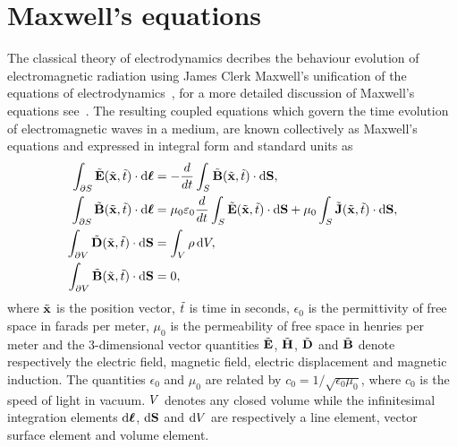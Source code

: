 \section{Maxwell's equations}
The classical theory of electrodynamics decribes the behaviour evolution of electromagnetic radiation using James Clerk Maxwell's unification of the equations of electrodynamics~\cite{Maxwell:1863ur}, for a more detailed discussion of Maxwell's equations see~\cite{Balanis:ui,Jackson:490457}. The resulting coupled equations which govern the time evolution of electromagnetic waves in a medium, are known collectively as Maxwell's equations and expressed in integral form and standard units as
\begin{subequations}
\begin{align}
    \int_{\partial S} \tilde{\mathbf{E}}(\tilde{\mathbf{x}},\tilde{t}) \cdot \mathrm{d}\boldsymbol{\ell}  &= - \frac{d}{dt} \int_{S} \tilde{\mathbf{B}}(\tilde{\mathbf{x}},\tilde{t}) \cdot \mathrm{d}\mathbf{S}, \label{eq:maxwell-faraday-integral} \\
    \int_{\partial S} \tilde{\mathbf{B}}(\tilde{\mathbf{x}},\tilde{t}) \cdot \mathrm{d}\boldsymbol{\ell} &= \mu_0 \varepsilon_0 \frac{d}{dt} \int_{S} \tilde{\mathbf{E}}(\tilde{\mathbf{x}},\tilde{t}) \cdot \mathrm{d}\mathbf{S} +  \mu_0 \int_{S} \tilde{\mathbf{J}}(\tilde{\mathbf{x}},\tilde{t}) \cdot \mathrm{d}\mathbf{S}, \label{eq:maxwell-ampere-integral} \\
    \int_{\partial V} \tilde{\mathbf{D}}(\tilde{\mathbf{x}},\tilde{t})\cdot\mathrm{d}\mathbf{S} &= \int_V \rho \,\mathrm{d}V, \label{maxwell-gauss-integral} \\
    \int_{\partial V} \tilde{\mathbf{B}}(\tilde{\mathbf{x}},\tilde{t})\cdot\mathrm{d}\mathbf{S} &= 0, \label{maxwell-gauss-magnetism-integral}
\end{align}
\end{subequations}
where $\tilde{\mathbf{x}}$ is the position vector, $\tilde{t}$ is time in seconds, $\epsilon_0$ is the permittivity of free space in farads per meter, $\mu_0$ is the permeability of free space in henries per meter and the 3-dimensional vector quantities $\tilde{\mathbf{E}}$, $\tilde{\mathbf{H}}$, $\tilde{\mathbf{D}}$ and $\tilde{\mathbf{B}}$ denote respectively the electric field, magnetic field, electric displacement and magnetic induction. The quantities $\epsilon_0$ and $\mu_0$ are related by $c_0 = 1/ \sqrt{\epsilon_0 \mu_0}$, where $c_0$ is the speed of light in vacuum.
$V$ denotes any closed volume while the infinitesimal integration elements $\mathrm{d}\boldsymbol{\ell}$, $\mathrm{d}\mathbf{S}$ and $\mathrm{d}V$ are respectively a line element, vector surface element and volume element.
